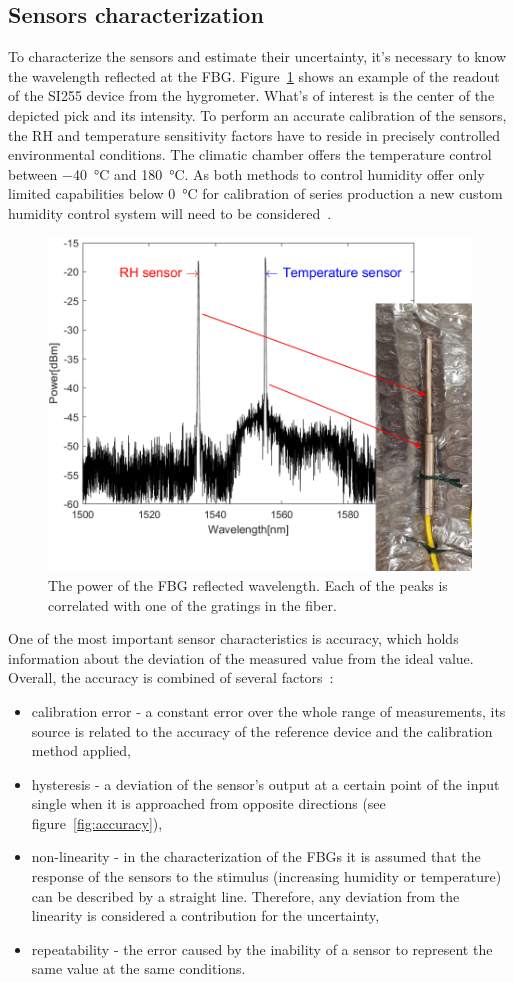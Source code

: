 \subsection{Sensors characterization}
To characterize the sensors and estimate their uncertainty, it's necessary to know the wavelength reflected at the \gls{FBG}. Figure~\ref{fig_hygrometer1} shows an example of the readout of the SI255 device from the hygrometer. What's of interest is the center of the depicted pick and its intensity. To perform an accurate calibration of the sensors, the \gls{RH} and temperature sensitivity factors have to reside in precisely controlled environmental conditions. The climatic chamber offers the temperature control between \SI{-40}{\celsius} and \SI{180}{\celsius}. As both methods to control humidity offer only limited capabilities below \SI{0}{\celsius} for calibration of series production a new custom humidity control system will need to be considered~\cite{Berruti, Veldscholte:2021wjt}. 
\begin{figure}[!h]
\centering
\includegraphics[width=0.6\columnwidth]{Chapter5/images/hygr.png}
\caption{The power of the FBG reflected wavelength. Each of the peaks is correlated with one of the gratings in the fiber.}
\label{fig_hygrometer1}
\end{figure}
One of the most important sensor characteristics is accuracy, which holds information about the deviation of the measured value from the ideal value. Overall, the accuracy is combined of several factors~\cite{sensors_physics}:
\begin{itemize}
    \item calibration error - a constant error over the whole range of measurements, its source is related to the accuracy of the reference device and the calibration method applied,
    \item hysteresis - a deviation of the sensor's output at a certain point of the input single when it is approached from opposite directions (see figure~\ref{fig:accuracy}), 
    \item non-linearity - in the characterization of the \glspl{FBG} it is assumed that the response of the sensors to the stimulus (increasing humidity or temperature) can be described by a straight line. Therefore, any deviation from the linearity is considered a contribution for the uncertainty,
    \item repeatability - the error caused by the inability of a sensor to represent the same value at the same conditions. 
\end{itemize}
